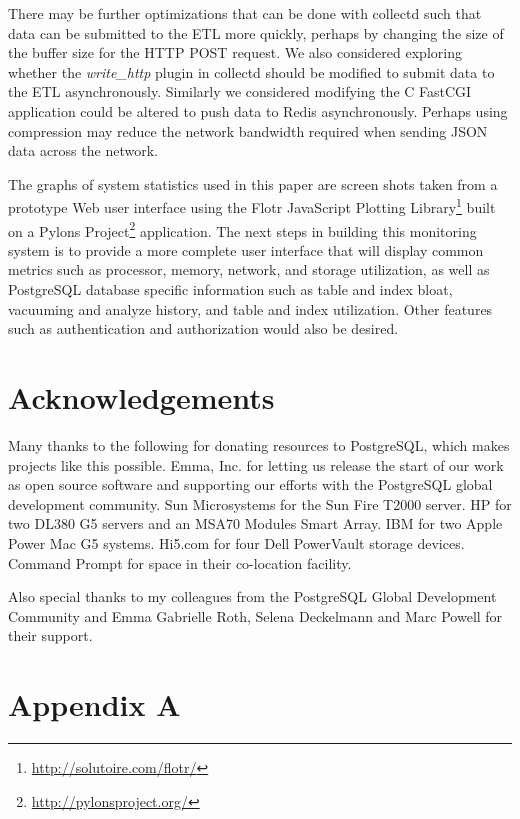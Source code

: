 \documentclass[twocolumn,letterpaper]{article}
\begin{document}
There may be further optimizations that can be done with collectd such that
data can be submitted to the ETL more quickly, perhaps by changing the size of
the buffer size for the HTTP POST request.  We also considered exploring
whether the \textit{write\_http} plugin in collectd should be modified to
submit data to the ETL asynchronously.  Similarly we considered modifying the C
FastCGI application could be altered to push data to Redis asynchronously.
Perhaps using compression may reduce the network bandwidth required when
sending JSON data across the network.

The graphs of system statistics used in this paper are screen shots taken from
a prototype Web user interface using the Flotr JavaScript Plotting
Library\footnote{\url{http://solutoire.com/flotr/}} built on a Pylons
Project\footnote{\url{http://pylonsproject.org/}} application.  The next steps
in building this monitoring system is to provide a more complete user interface
that will display common metrics such as processor, memory, network, and
storage utilization, as well as PostgreSQL database specific information such
as table and index bloat, vacuuming and analyze history, and table and index
utilization.  Other features such as authentication and authorization would
also be desired.

\section{Acknowledgements}

Many thanks to the following for donating resources to PostgreSQL,
which makes projects like this possible.  Emma, Inc. for letting us release the
start of our work as open source software and supporting our efforts with the
PostgreSQL global development community.  Sun Microsystems for the Sun Fire
T2000 server.  HP for two DL380 G5 servers and an MSA70 Modules Smart Array.
IBM for two Apple Power Mac G5 systems.  Hi5.com for four Dell PowerVault
storage devices.  Command Prompt for space in their co-location facility.

Also special thanks to my colleagues from the PostgreSQL Global Development
Community and Emma Gabrielle Roth, Selena Deckelmann and Marc Powell for their
support.




\section*{Appendix A}
\end{document}
